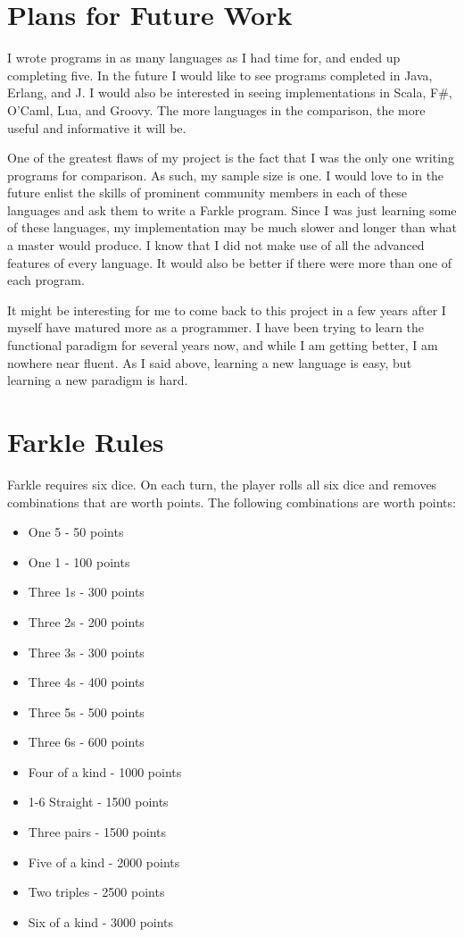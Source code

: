 \documentclass{article}
\begin{document}
\section{Plans for Future Work}

I wrote programs in as many languages as I had time for, and ended up completing
five.  In the future I would like to see programs completed in Java,
Erlang, and J.  I would also be interested in seeing implementations in Scala,
F\#, O'Caml, Lua, and Groovy.  The more languages in the comparison, the more
useful and informative it will be.

One of the greatest flaws of my project is the fact that I was the only one
writing programs for comparison.  As such, my sample size is one.  I would love
to in the future enlist the skills of prominent community members in each of
these languages and ask them to write a Farkle program.  Since I was just
learning some of these languages, my implementation may be much slower and
longer than what a master would produce.  I know that I did not make use of all
the advanced features of every language.  It would also be better if there were
more than one of each program.

It might be interesting for me to come back to this project in a few years after
I myself have matured more as a programmer.  I have been trying to learn the
functional paradigm for several years now, and while I am getting better, I am
nowhere near fluent.  As I said above, learning a new language is easy, but
learning a new paradigm is hard.




\appendix
\section{Farkle Rules}
\label{sec:farklerules}

Farkle requires six dice.  On each turn, the player rolls all six dice and
removes combinations that are worth points.  The following combinations are
worth points:

\begin{itemize}
\item One 5 - 50 points
\item One 1 - 100 points
\item Three 1s - 300 points
\item Three 2s - 200 points
\item Three 3s - 300 points
\item Three 4s - 400 points
\item Three 5s - 500 points
\item Three 6s - 600 points
\item Four of a kind - 1000 points
\item 1-6 Straight   - 1500 points
\item Three pairs    - 1500 points
\item Five of a kind - 2000 points
\item Two triples    - 2500 points
\item Six of a kind  - 3000 points
\end{itemize}
\end{document}

